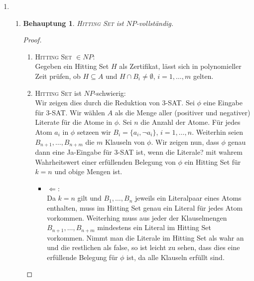 \documentclass[a4paper]{scrartcl}
\newtheorem*{proposition}{Behauptung}
\begin{document}
\begin{enumerate}[label=\bfseries \arabic*]
\begin{enumerate}
\end{enumerate}

\item %
\begin{enumerate}
    \item
        \begin{proposition}
            \textsc{Hitting Set} ist $NP$-vollständig.
        \end{proposition}
        \begin{proof}
            \hfill \\
            \begin{enumerate}
                \item \textsc{Hitting Set} $\in NP$: \\
                    Gegeben ein Hitting Set $H$ als Zertifikat, lässt sich in
                    polynomieller Zeit prüfen, ob $H \subseteq A$ und $H \cap
                    B_i \neq \emptyset$, $i = 1, \dotsc, m$ gelten.

                \item \textsc{Hitting Set} ist $NP$-schwierig: \\
                    Wir zeigen dies durch die Reduktion von 3-SAT.
                    Sei $\phi$ eine Eingabe für 3-SAT. Wir wählen $A$ als die
                    Menge aller (positiver und negativer) Literate für die
                    Atome in $\phi$.
                    Sei $n$ die Anzahl der Atome. Für jedes Atom $a_i$ in
                    $\phi$ setzeen wir $B_i = \{a_i, \lnot a_i\}$, $i = 1,
                    \dotsc, n$. Weiterhin seien $B_{n+1}, \dotsc, B_{n+m}$ die
                    $m$ Klauseln von $\phi$. Wir zeigen nun, dass $\phi$ genau
                    dann eine Ja-Eingabe für 3-SAT ist, wenn die Literale? mit
                    wahrem Wahrheitswert einer erfüllenden Belegung von $\phi$
                    ein Hitting Set für $k = n$ und obige Mengen ist.
                    \begin{itemize}
                        \item $\Leftarrow$: \\
                            Da $k = n$ gilt und $B_1, \dotsc, B_n$ jeweils ein
                            Literalpaar eines Atoms enthalten, muss im Hitting
                            Set genau ein Literal für jedes Atom vorkommen.
                            Weiterhing muss aus jeder der Klauselmengen
                            $B_{n+1}, \dotsc, B_{n+m}$ mindestens ein Literal
                            im Hitting Set vorkommen. Nimmt man die Literale im
                            Hitting Set als wahr an und die restlichen als
                            false, so ist leicht zu sehen, dass dies eine
                            erfüllende Belegung für $\phi$ ist, da alle
                            Klauseln erfüllt sind.


\end{itemize}
\end{enumerate}
\end{proof}
\end{enumerate}
\end{enumerate}
\end{document}
